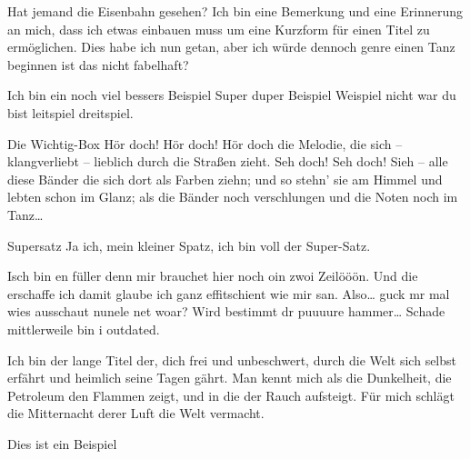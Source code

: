 \documentclass[twocolumn]{article}
\begin{document}
    \blindtext[2]

    \begin{bemerkung}{Hat jemand die Eisenbahn gesehen?}
        Ich bin eine Bemerkung und eine Erinnerung an mich, dass ich etwas einbauen
        muss um eine Kurzform für einen Titel zu ermöglichen. Dies habe ich nun getan, aber ich würde dennoch genre einen Tanz beginnen ist das nicht fabelhaft?
    \end{bemerkung}

    \blindtext

    \begin{beispiel}{Ich bin ein noch viel bessers Beispiel}
        \label{bei:beiref}Super duper Beispiel Weispiel nicht war du bist leitspiel dreitspiel.
    \end{beispiel}

    \blindtext

    \begin{definition*}{Die Wichtig-Box}
        Hör doch! Hör doch! Hör doch die Melodie, die sich -- klangverliebt -- lieblich durch die Straßen zieht. 
        Seh doch! Seh doch! Sieh -- alle diese Bänder die sich dort
        als Farben ziehn; und so stehn' sie am Himmel und lebten
        schon im Glanz; als die Bänder noch verschlungen und
        die Noten noch im Tanz\ldots
    \end{definition*}

    \blindtext[1]

    \begin{satz}{Supersatz}
        Ja ich, mein kleiner Spatz, ich bin voll der Super-Satz.
    \end{satz}

    Isch bin en füller denn mir brauchet hier noch oin zwoi Zeilööön.  Und die erschaffe ich damit glaube ich ganz effitschient wie mir san. Also\ldots{} guck mr mal wies ausschaut nunele net woar? Wird bestimmt dr puuuure hammer\ldots
    Schade mittlerweile bin i outdated.
    \begin{definition}{Ich bin der lange Titel der, dich frei und unbeschwert, durch die Welt sich selbst erfährt und heimlich seine Tagen gährt.}
        Man kennt mich als die Dunkelheit, die Petroleum den Flammen zeigt, und in die der Rauch aufsteigt.
        Für mich schlägt die Mitternacht derer Luft die Welt
        vermacht.
    \end{definition}

    \blindtext

    \begin{beispiel*}{Dies ist ein Beispiel}
        \blindtext
    \end{beispiel*}
\end{document}

